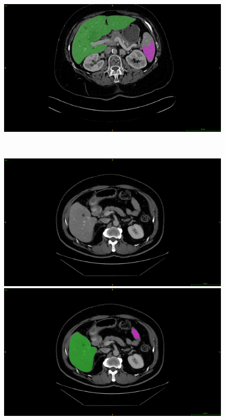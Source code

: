 \begin{figure}[ht!]
\begin{mdframed}[backgroundcolor=blue!50,linecolor=blue!50]
\begin{minipage}{0.45\linewidth}
		\end{minipage} \hspace{-0.1cm}
		\begin{minipage}{0.45\linewidth}
			\includegraphics[width=\linewidth]{images/MisSegmentations/TCGA-BC-A10Z_slice30_liverPrediction_Cmap}
		\end{minipage} \\
		\begin{minipage}{0.45\linewidth}
			\includegraphics[width=\linewidth]{images/MisSegmentations/TCGA-DD-A1EA_slice30_raw}
		\end{minipage} \hspace{-0.1cm}
		\begin{minipage}{0.45\linewidth}
			\includegraphics[width=\linewidth]{images/MisSegmentations/TCGA-DD-A1EA_slice30_liverPrediction_Cmap}

\end{minipage}
\end{mdframed}
\end{figure}
